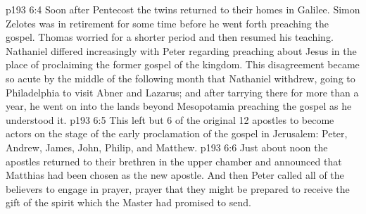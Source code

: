 \vs p193 6:4 \pc Soon after Pentecost the twins returned to their homes in Galilee. Simon Zelotes was in retirement for some time before he went forth preaching the gospel. Thomas worried for a shorter period and then resumed his teaching. Nathaniel differed increasingly with Peter regarding preaching about Jesus in the place of proclaiming the former gospel of the kingdom. This disagreement became so acute by the middle of the following month that Nathaniel withdrew, going to Philadelphia to visit Abner and Lazarus; and after tarrying there for more than a year, he went on into the lands beyond Mesopotamia preaching the gospel as he understood it.
\vs p193 6:5 This left but 6 of the original 12 apostles to become actors on the stage of the early proclamation of the gospel in Jerusalem: Peter, Andrew, James, John, Philip, and Matthew.
\vs p193 6:6 \pc Just about noon the apostles returned to their brethren in the upper chamber and announced that Matthias had been chosen as the new apostle. And then Peter called all of the believers to engage in prayer, prayer that they might be prepared to receive the gift of the spirit which the Master had promised to send.
\quizlink
